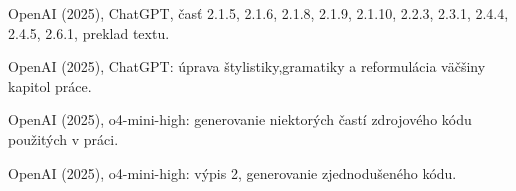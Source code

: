 \begin{trivlist}
\item OpenAI (2025), ChatGPT, časť 2.1.5, 2.1.6, 2.1.8, 2.1.9, 2.1.10, 2.2.3, 2.3.1, 2.4.4, 2.4.5, 2.6.1, preklad textu.

\item OpenAI (2025), ChatGPT: úprava štylistiky,gramatiky a reformulácia väčšiny kapitol práce.

\item OpenAI (2025), o4-mini-high: generovanie niektorých častí zdrojového kódu použitých v práci.

\item OpenAI (2025), o4-mini-high: výpis 2, generovanie zjednodušeného kódu.

\end{trivlist}
